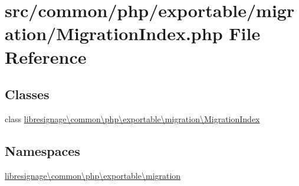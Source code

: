 \hypertarget{MigrationIndex_8php}{}\section{src/common/php/exportable/migration/\+Migration\+Index.php File Reference}
\label{MigrationIndex_8php}
\subsection*{Classes}
\begin{DoxyCompactItemize}
\item 
class \hyperlink{classlibresignage_1_1common_1_1php_1_1exportable_1_1migration_1_1MigrationIndex}{libresignage\textbackslash{}common\textbackslash{}php\textbackslash{}exportable\textbackslash{}migration\textbackslash{}\+Migration\+Index}
\end{DoxyCompactItemize}
\subsection*{Namespaces}
\begin{DoxyCompactItemize}
\item 
 \hyperlink{namespacelibresignage_1_1common_1_1php_1_1exportable_1_1migration}{libresignage\textbackslash{}common\textbackslash{}php\textbackslash{}exportable\textbackslash{}migration}
\end{DoxyCompactItemize}
